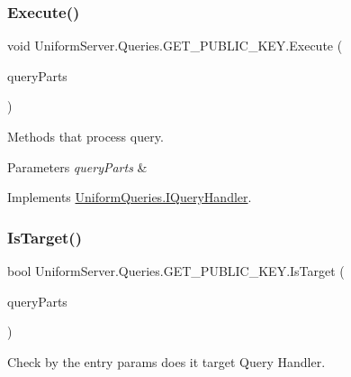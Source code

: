 \subsubsection{\texorpdfstring{Execute()}{Execute()}}
{\footnotesize\ttfamily void Uniform\+Server.\+Queries.\+G\+E\+T\+\_\+\+P\+U\+B\+L\+I\+C\+\_\+\+K\+E\+Y.\+Execute (\begin{DoxyParamCaption}\item[{\mbox{\hyperlink{struct_uniform_queries_1_1_query_part}{Query\+Part}} \mbox{[}$\,$\mbox{]}}]{query\+Parts }\end{DoxyParamCaption})}



Methods that process query. 


\begin{DoxyParams}{Parameters}
{\em query\+Parts} & \\
\hline
\end{DoxyParams}


Implements \mbox{\hyperlink{interface_uniform_queries_1_1_i_query_handler_a66d15db03bdd5b0caf6eef96f9b803c0}{Uniform\+Queries.\+I\+Query\+Handler}}.

\mbox{\label{class_uniform_server_1_1_queries_1_1_g_e_t___p_u_b_l_i_c___k_e_y_ae27d462fe9ccbbf22ac03c9ead9cbe8f}} 
\subsubsection{\texorpdfstring{Is\+Target()}{IsTarget()}}
{\footnotesize\ttfamily bool Uniform\+Server.\+Queries.\+G\+E\+T\+\_\+\+P\+U\+B\+L\+I\+C\+\_\+\+K\+E\+Y.\+Is\+Target (\begin{DoxyParamCaption}\item[{\mbox{\hyperlink{struct_uniform_queries_1_1_query_part}{Query\+Part}} \mbox{[}$\,$\mbox{]}}]{query\+Parts }\end{DoxyParamCaption})}



Check by the entry params does it target Query Handler. 


